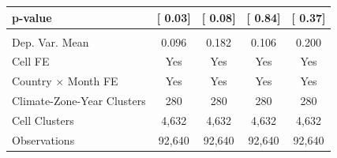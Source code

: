 {\begin{tabular}{l*{4}{c}}
\hspace{15pt} p-value&[     0.03]         &[     0.08]         &[     0.84]         &[     0.37]         \\
\hline \\ Dep. Var. Mean& 0.096         & 0.182         & 0.106         & 0.200         \\
Cell FE             &   Yes         &   Yes         &   Yes         &   Yes         \\
Country $\times$ Month FE&   Yes         &   Yes         &   Yes         &   Yes         \\
Climate-Zone-Year Clusters&   280         &   280         &   280         &   280         \\
Cell Clusters       & 4,632         & 4,632         & 4,632         & 4,632         \\
Observations        &92,640         &92,640         &92,640         &92,640         \\
\bottomrule
\end{tabular}
}
